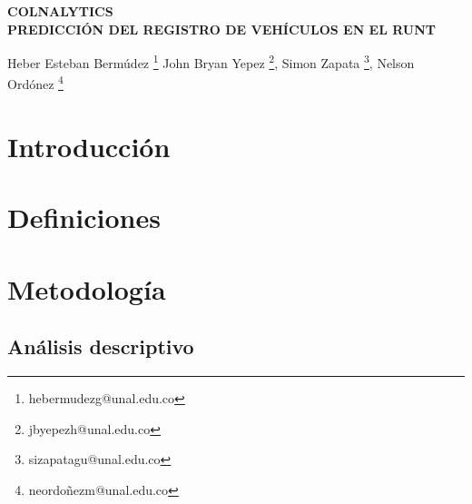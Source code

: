 \documentclass[11pt,twoside]{article}
\date{}
\begin{document}
	
	{
		\fancyhead[L]{}
		\fancyfoot[LO,RE]{}
		\fancyfoot[LE,RO]{ \vspace{10pt}\thepage}
		\renewcommand{\headrulewidth}{0pt}
		\renewcommand{\footrulewidth}{0pt}
	}
	
	\thispagestyle{firststyle}
	\begin{center}
		\Large{{\bf COLNALYTICS\\
				\vspace{20pt}   PREDICCIÓN DEL REGISTRO DE VEHÍCULOS EN EL RUNT\\ 
				\vspace{10pt}}}
	\end{center}
	
	{\normalsize{
			Heber Esteban Bermúdez			\footnote{\footnotesize{ hebermudezg@unal.edu.co}}
			John Bryan Yepez				\footnote{\footnotesize{ jbyepezh@unal.edu.co}},
			Simon Zapata 					\footnote{\footnotesize{sizapatagu@unal.edu.co}},
			Nelson Ordónez 			\footnote{\footnotesize{neordoñezm@unal.edu.co}}
	}}
	
	
	
	
	
	\begin{abstract}
	
	\end{abstract}
	
	
	
	\section{Introducción}
	\section{Definiciones}
	\section{Metodología}
	\subsection{Análisis descriptivo}
	
	
	
\end{document}
